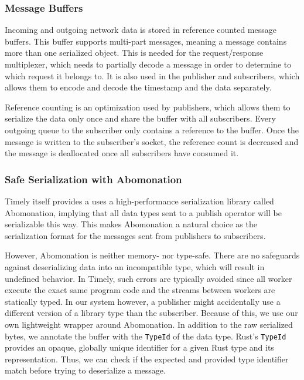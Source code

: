 \subsubsection{Message Buffers}

Incoming and outgoing network data is stored in reference counted message buffers.
This buffer supports multi-part messages, meaning a message contains more than
one serialized object. This is needed for the request/response multiplexer, which
needs to partially decode a message in order to determine to which request it
belongs to. It is also used in the publisher and subscribers, which allows them
to encode and decode the timestamp and the data separately.

Reference counting is an optimization used by publishers, which allows them to
serialize the data only once and share the buffer with all subscribers. Every
outgoing queue to the subscriber only contains a reference to the buffer. Once
the message is written to the subscriber's socket, the reference count is
decreased and the message is deallocated once all subscribers have consumed it.

\subsubsection{Safe Serialization with Abomonation}

Timely itself provides a uses a high-performance serialization library called
Abomonation, implying that all data types sent to a publish operator will be
serializable this way. This makes Abomonation a natural choice as the serialization
format for the messages sent from publishers to subscribers. 

However, Abomonation is neither memory- nor type-safe. There are no safeguards
against deserializing data into an incompatible type, which will result in undefined
behavior. In Timely, such errors are typically avoided since all worker
execute the exact same program code and the streams between workers are
statically typed. In our system however, a publisher might accidentally use
a different version of a library type than the subscriber. Because of this,
we use our own lightweight wrapper around Abomonation. In addition to the raw
serialized bytes, we annotate the buffer with the \lstinline{TypeId} of the
data type. Rust's \lstinline{TypeId} provides an opaque, globally unique
identifier for a given Rust type and its representation. Thus, we can check
if the expected and provided type identifier match before trying to deserialize
a message.

